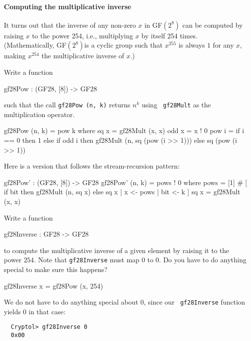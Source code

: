 \paragraph*{Computing the multiplicative inverse} It turns out that the
inverse of any non-zero $x$ in GF$(2^8)$ can be computed by raising
$x$ to the power 254, i.e., multiplying $x$ by itself 254
times. (Mathematically, GF$(2^8)$\indGF is a cyclic group such that
$x^{255}$ is always $1$ for any $x$, making $x^{254}$ the
multiplicative inverse of $x$.)

\begin{Exercise}\label{ex:gfmi:0}
Write a function
\begin{code}
  gf28Pow : (GF28, [8]) -> GF28
\end{code}
such that the call {\tt gf28Pow (n, k)} returns $n^k$ using {\tt
  gf28Mult} as the multiplication operator.  
\end{Exercise}
\begin{Answer}
\begin{code}
  gf28Pow (n, k) = pow k
     where   sq x  = gf28Mult (x, x)
             odd x = x ! 0
             pow i = if i == 0 then 1
                     else if odd i
                          then gf28Mult (n, sq (pow (i >> 1)))
                          else sq (pow (i >> 1))
\end{code}
Here is a version that follows the stream-recursion pattern:
\begin{code}
  gf28Pow' : (GF28, [8]) -> GF28
  gf28Pow' (n, k) = pows ! 0
    where   pows = [1] # [ if bit then gf28Mult (n, sq x)
                                  else sq x
                         | x <- pows
                         | bit <- k
                         ]
            sq x = gf28Mult (x, x)
\end{code}
\end{Answer}

\begin{Exercise}\label{ex:gfmi:01}
Write a function
\begin{code}
  gf28Inverse : GF28 -> GF28
\end{code}
to compute the multiplicative inverse of a given element by raising it
to the power $254$. Note that {\tt gf28Inverse} must map $0$ to
$0$. Do you have to do anything special to make sure this happens?
\end{Exercise}
\begin{Answer}
\begin{code}
  gf28Inverse x = gf28Pow (x, 254)
\end{code}
We do not have to do anything special about $0$, since our {\tt
  gf28Inverse} function yields $0$ in that case:
\begin{Verbatim}
  Cryptol> gf28Inverse 0
  0x00
\end{Verbatim}
\end{Answer}

